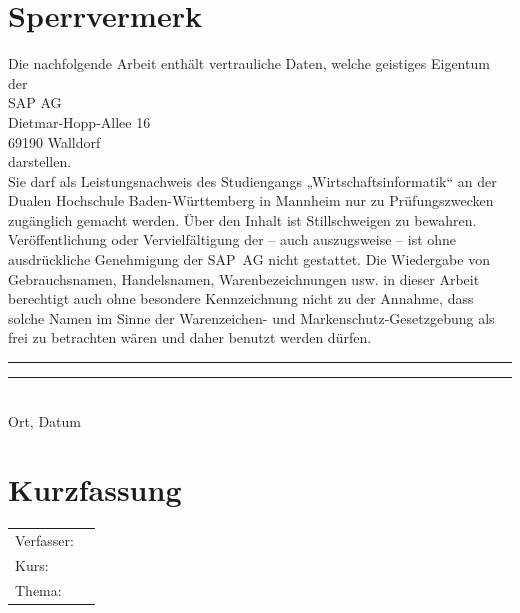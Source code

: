 \documentclass[fontsize=12pt,listof=totoc]{scrreprt}
\newcommand{\Abstractpath}{../text/abstract.tex}
\begin{document}
		\chapter*{Sperrvermerk}
			Die nachfolgende Arbeit enthält vertrauliche Daten, welche geistiges Eigentum der\\[\baselineskip]
			SAP AG \\
			Dietmar-Hopp-Allee 16 \\
			69190 Walldorf \\
			\linebreak
			darstellen.\\[\baselineskip]
			Sie darf als Leistungsnachweis des Studiengangs „Wirtschaftsinformatik“ an der Dualen Hochschule Baden-Württemberg in Mannheim nur zu Prüfungszwecken zu\-gäng\-lich gemacht werden. Über den Inhalt ist Stillschweigen zu bewahren. Ver\-öf\-fent\-li\-chung oder Vervielfältigung der \Arbeitstyp{} – auch auszugsweise – ist ohne aus\-drück\-liche Genehmigung der SAP~AG nicht gestattet. Die Wiedergabe von Gebrauchsnamen, Handelsnamen, Warenbezeichnungen usw. in dieser Arbeit berechtigt auch ohne besondere Kennzeichnung nicht zu der Annahme, dass solche Namen im Sinne der Warenzeichen- und Markenschutz-Gesetzgebung als frei zu betrachten wären und daher benutzt werden dürfen.\\
			\vfill
			\noindent
			\rule[-7px]{120px}{.4pt}\hfill\rule[-7px]{120px}{.4pt}\\
			Ort, Datum\hfill{}
	\fi
	
	\newpage
	\hypertarget{abstract}{}
	\thispagestyle{scrplain}
	\chapter*{Kurzfassung}
		\begin{tabular}{lp{}}
			Verfasser: & \Ersteller \: & \Kurs \\
			Thema: & \Titel \\
		\end{tabular}
		\\[\baselineskip]
		

	\newpage
		\hypertarget{toc}{}
		\bookmark[level=chapter, dest=toc]{\contentsname}
	\tableofcontents
		
	\iftotalfigures
		\listoffigures
	\fi
	
	\iftotallstlistings
		\lstlistoflistings
	\fi
		
\end{document}
